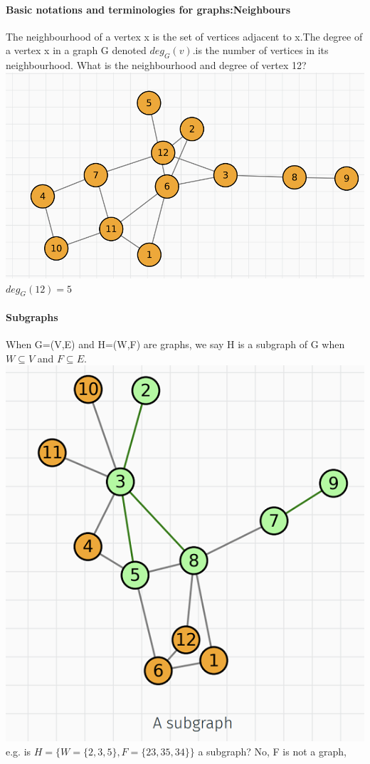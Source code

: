 \documentclass{article}
\begin{document}
\paragraph{Basic notations and terminologies for graphs:Neighbours}
The neighbourhood of a vertex x is the set of vertices adjacent to x.The degree of a vertex x in a graph G denoted $deg_G(v)$.is the number of vertices in its neighbourhood. \newline
What is the neighbourhood and degree of vertex 12?\newline
\includegraphics{0025}\newline
$deg_G(12)=5$
\paragraph{Subgraphs}
When G=(V,E) and H=(W,F) are graphs, we say H is a subgraph of G when $W\subseteq V$ and $F\subseteq E$.\newline
\includegraphics{0026}\newline
e.g. is $H=\{W=\{2,3,5\},F=\{23,35,34\}\}$ a subgraph?\newline
No, F is not a graph,
\end{document}
